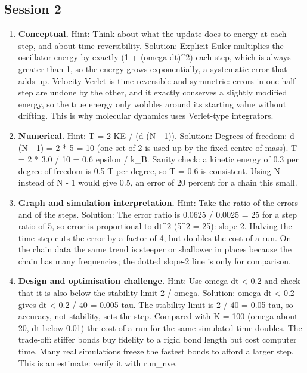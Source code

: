 \documentclass[11pt,a4paper]{article}
\begin{document}
\subsection*{Session 2}
\begin{enumerate}[nosep]
\item \textbf{Conceptual.} Hint: Think about what the update does to energy at each step, and about time reversibility. Solution: Explicit Euler multiplies the oscillator energy by exactly (1 + (omega dt)\textasciicircum{}2) each step, which is always greater than 1, so the energy grows exponentially, a systematic error that adds up. Velocity Verlet is time-reversible and symmetric: errors in one half step are undone by the other, and it exactly conserves a slightly modified energy, so the true energy only wobbles around its starting value without drifting. This is why molecular dynamics uses Verlet-type integrators.
\item \textbf{Numerical.} Hint: T = 2 KE / (d (N - 1)). Solution: Degrees of freedom: d (N - 1) = 2 * 5 = 10 (one set of 2 is used up by the fixed centre of mass). T = 2 * 3.0 / 10 = 0.6 epsilon / k\_B. Sanity check: a kinetic energy of 0.3 per degree of freedom is 0.5 T per degree, so T = 0.6 is consistent. Using N instead of N - 1 would give 0.5, an error of 20 percent for a chain this small.
\item \textbf{Graph and simulation interpretation.} Hint: Take the ratio of the errors and of the steps. Solution: The error ratio is 0.0625 / 0.0025 = 25 for a step ratio of 5, so error is proportional to dt\textasciicircum{}2 (5\textasciicircum{}2 = 25): slope 2. Halving the time step cuts the error by a factor of 4, but doubles the cost of a run. On the chain data the same trend is steeper or shallower in places because the chain has many frequencies; the dotted slope-2 line is only for comparison.
\item \textbf{Design and optimisation challenge.} Hint: Use omega dt \textless{} 0.2 and check that it is also below the stability limit 2 / omega. Solution: omega dt \textless{} 0.2 gives dt \textless{} 0.2 / 40 = 0.005 tau. The stability limit is 2 / 40 = 0.05 tau, so accuracy, not stability, sets the step. Compared with K = 100 (omega about 20, dt below 0.01) the cost of a run for the same simulated time doubles. The trade-off: stiffer bonds buy fidelity to a rigid bond length but cost computer time. Many real simulations freeze the fastest bonds to afford a larger step. This is an estimate: verify it with run\_nve.
\end{enumerate}
\end{document}
